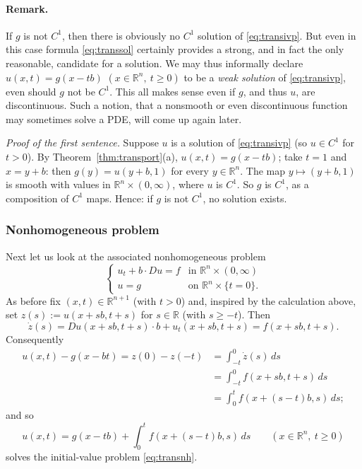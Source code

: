 \documentclass[11pt]{article}
\theoremstyle{plain}
\theoremstyle{definition}
\theoremstyle{remark}
\begin{document}
\paragraph{Remark.} If $g$ is not $C^1$, then there is obviously no $C^1$ solution of \eqref{eq:transivp}. But even in this case formula \eqref{eq:transsol} certainly provides a strong, and in fact the only reasonable, candidate for a solution. We may thus informally declare $u(x,t) = g(x - tb)$ $(x \in \mathbb{R}^n,\ t \ge 0)$ to be a \emph{weak solution} of \eqref{eq:transivp}, even should $g$ not be $C^1$. This all makes sense even if $g$, and thus $u$, are discontinuous. Such a notion, that a nonsmooth or even discontinuous function may sometimes solve a PDE, will come up again later.

\emph{Proof of the first sentence.} Suppose $u$ is a solution of \eqref{eq:transivp} (so $u \in C^1$ for $t > 0$). By Theorem~\ref{thm:transport}(a), $u(x,t) = g(x - tb)$; take $t = 1$ and $x = y + b$: then $g(y) = u(y + b, 1)$ for every $y \in \mathbb{R}^n$. The map $y \mapsto (y + b,1)$ is smooth with values in $\mathbb{R}^n \times (0,\infty)$, where $u$ is $C^1$. So $g$ is $C^1$, as a composition of $C^1$ maps. Hence: if $g$ is not $C^1$, no solution exists.

\subsubsection{Nonhomogeneous problem}

Next let us look at the associated nonhomogeneous problem
\begin{equation}\label{eq:transnh}
\begin{cases} u_t + b\cdot Du = f & \text{in } \mathbb{R}^n \times (0,\infty) \\ u = g & \text{on } \mathbb{R}^n \times \{t = 0\}. \end{cases}
\end{equation}
As before fix $(x,t) \in \mathbb{R}^{n+1}$ (with $t > 0$) and, inspired by the calculation above, set $z(s) := u(x + sb, t + s)$ for $s \in \mathbb{R}$ (with $s \geq -t$). Then
$$ \dot z(s) = Du(x + sb, t + s)\cdot b + u_t(x + sb, t + s) = f(x + sb, t + s). $$
Consequently
\begin{align*}
u(x,t) - g(x - bt) = z(0) - z(-t) &= \int_{-t}^0 \dot z(s)\, ds \\
&= \int_{-t}^0 f(x + sb, t + s)\, ds \\
&= \int_0^t f(x + (s - t)b, s)\, ds;
\end{align*}
and so
\begin{equation}\label{eq:transnhsol}
u(x,t) = g(x - tb) + \int_0^t f(x + (s - t)b, s)\, ds \qquad (x \in \mathbb{R}^n,\ t \geq 0)
\end{equation}
solves the initial-value problem \eqref{eq:transnh}.
\end{document}

